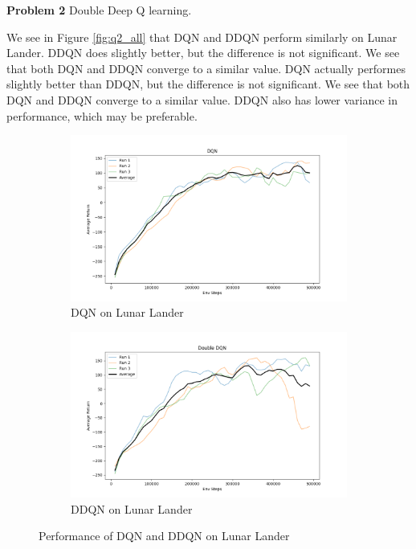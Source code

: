 \documentclass[11pt]{article}
\begin{document}
\large{\textbf{Problem 2}}
Double Deep Q learning.

We see in Figure \ref{fig:q2_all} that DQN and DDQN perform similarly on Lunar Lander. DDQN does slightly better, but the difference is not significant. We see that both DQN and DDQN converge to a similar value.
DQN actually performes slightly better than DDQN, but the difference is not significant. We see that both DQN and DDQN converge to a similar value.
DDQN also has lower variance in performance, which may be preferable.

\begin{figure}
    \begin{subfigure}{.5\textwidth}
        \centering
        \includegraphics[width=.95 \linewidth]{hw3_q2_dqn.png}
        \caption{DQN on Lunar Lander}
        \label{fig:}
    \end{subfigure}
    \begin{subfigure}{.5\textwidth}
        \centering
        \includegraphics[width=.95 \linewidth]{hw3_q2_ddqn.png}
        \caption{DDQN on Lunar Lander}
        \label{fig:}
    \end{subfigure}
    \caption{Performance of DQN and DDQN on Lunar Lander}
\end{figure}
\end{document}
